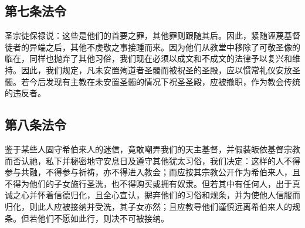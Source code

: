 \par


\subsection{第七条法令}

\par

圣宗徒保禄说：这些是他们的首要之罪，其他罪则跟随其后。因此，紧随诬蔑基督徒者的异端之后，其他不虔敬之事接踵而来。因为他们从教堂中移除了可敬圣像的临在，同样也抛弃了其他习俗，我们现在必须以成文和不成文的法律予以复兴和维持。因此，我们规定，凡未安置殉道者圣髑而被祝圣的圣殿，应以惯常礼仪安放圣髑。若今后发现有主教在未安置圣髑的情况下祝圣圣殿，应被撤职，作为教会传统的违反者。\par

\par


\subsection{第八条法令}

\par

鉴于某些人固守希伯来人的迷信，竟敢嘲弄我们的天主基督，并假装皈依基督宗教而否认祂，私下并秘密地守安息日及遵守其他犹太习俗，我们决定：这样的人不得参与共融，不得参与祈祷，亦不得进入教会；而应按其宗教公开作为希伯来人，且不得为他们的子女施行圣洗，也不得购买或拥有奴隶。但若其中有任何人，出于真诚之心并怀着信德归化，且全心宣认，摒弃他们的习俗和规条，并为使他人信服而归化，则此人应被接纳并受洗，其子女亦然；且应教导他们谨慎远离希伯来人的规条。但若他们不愿如此行，则决不可被接纳。\par

